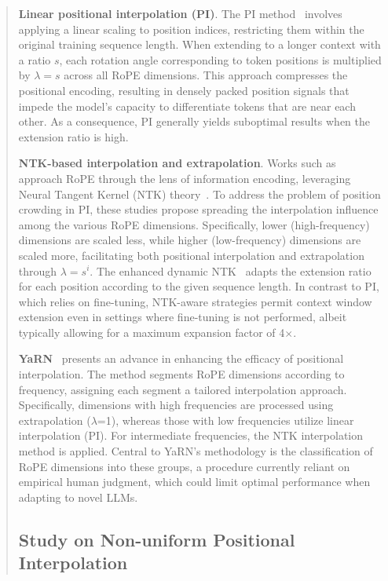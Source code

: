\begin{abstract}
\textbf{Linear positional interpolation (PI)}. The PI method~\cite{pi} involves applying a linear scaling to position indices, restricting them within the original training sequence length. When extending to a longer context with a ratio $s$, each rotation angle corresponding to token positions is multiplied by $\lambda=s$ across all RoPE dimensions. This approach compresses the positional encoding, resulting in densely packed position signals that impede the model's capacity to differentiate tokens that are near each other. As a consequence, PI generally yields suboptimal results when the extension ratio is high.

\textbf{NTK-based interpolation and extrapolation}. Works such as ~\cite{ntk,dynamicntk} approach RoPE through the lens of information encoding, leveraging Neural Tangent Kernel (NTK) theory~\cite{jacot2018neural,tancik2020fourier}. To address the problem of position crowding in PI, these studies propose spreading the interpolation influence among the various RoPE dimensions. Specifically, lower (high-frequency) dimensions are scaled less, while higher (low-frequency) dimensions are scaled more, facilitating both positional interpolation and extrapolation through $\lambda=s^{i}$. The enhanced dynamic NTK~\cite{dynamicntk} adapts the extension ratio for each position according to the given sequence length. In contrast to PI, which relies on fine-tuning, NTK-aware strategies permit context window extension even in settings where fine-tuning is not performed, albeit typically allowing for a maximum expansion factor of 4$\times$.

\textbf{YaRN}~\cite{yarn} presents an advance in enhancing the efficacy of positional interpolation. The method segments RoPE dimensions according to frequency, assigning each segment a tailored interpolation approach. Specifically, dimensions with high frequencies are processed using extrapolation ($\lambda$=1), whereas those with low frequencies utilize linear interpolation (PI). For intermediate frequencies, the NTK interpolation method is applied. Central to YaRN’s methodology is the classification of RoPE dimensions into these groups, a procedure currently reliant on empirical human judgment, which could limit optimal performance when adapting to novel LLMs.

\subsection{Study on Non-uniform Positional Interpolation}


\end{abstract}
